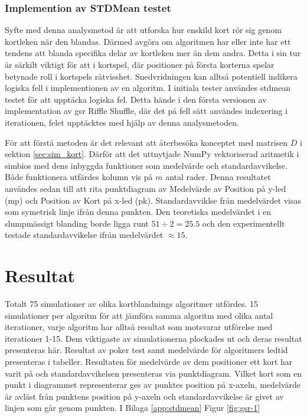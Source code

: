 \documentclass[swedish,a4paper]{article}
\begin{document}
\subsubsection{Implemention av STDMean testet}
Syfte med denna analysmetod är att utforska hur enskild kort rör sig genom
kortleken när den blandas. Därmed avgöra om algoritmen har eller inte har ett
tendens att blanda specifika delar av kortleken mer än dem andra. Detta i sin
tur är särkilt viktigt för att i kortspel, där positioner på första korterna
spelar betynade roll i kortspels rätvisshet. Snedvridningen kan alltså
potentiell indikera logiska fell i implementionen av en algoritm. I initiala
tester användes \gls{stdmean} testet för att upptäcka logiska fel. Detta hände i
den första versionen av implementation av \gls{gsr} Riffle Shuffle, där det på
fell sätt användes indexering i iterationen, felet upptäcktes med hjälp av denna
analysmetoden. 

För att förstå metoden är det relevant att återbesöka konceptet med matrisen $D$
i sektion \ref{sec:sim_kort}. Därför att det uttnytjade NumPy vektoriserad
aritmetik i simbios med dens inbyggda funktioner som medelvärde och
standardavvikelse. Både funktionera utfärdes kolumn vis på $m$ antal rader.
Denna resultatet användes sedan till att rita punktdiagram av Medelvärde av
Position på y-led (\gls{mp}) och Position av Kort på x-led (\gls{pk}).
Standardavviklse från medelvärdet visas som symetrisk linje ifrån denna punkten.
Den teoretiska medelvärdet i en slumpmässigt blanding borde ligga runt $51 \div
2 = 25.5$ och den experimentellt testade standardavvikelse ifrån medelvärdet
$\approx 15$.

\section{Resultat}


Totalt 75 simulationer av olika kortblandnings algoritmer utfördes. 15
simulationer per algoritm för att jämföra samma algoritm med olika antal
iterationer, varje algoritm har alltså resultat som motsvarar utförelse
med iterationer 1-15. Dem viktigaste av simulationerna plockades ut och
deras resultat presenteras här. Resultat av poker test samt medelvärde
för algoritmers ledtid presenteras i tabeller. Resultaten för medelvärde
av dem positioner ett kort har varit på och standardavvikelsen
presenteras via punktdiagram. Vilket kort som en punkt i diagrammet
representerar ges av punktes position på x-axeln, medelvärde är avläst
från punktens position på y-axeln och standardavvikelse är givet av
linjen som går genom punkten. I Bilaga \ref{app:stdmean} Figur \ref{fig:gsr-1}
\end{document}
